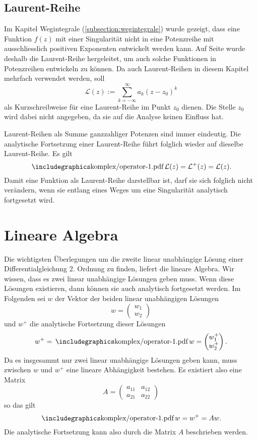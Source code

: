 \subsection{Laurent-Reihe}
Im Kapitel Wegintegrale (\ref{subsection:wegintegrale}) wurde gezeigt, dass eine Funktion $f(z)$ mit einer Singularität nicht in eine Potenzreihe mit ausschliesslich positiven Exponenten entwickelt werden kann. Auf Seite \pageref{sssec:LaurentReihen} wurde deshalb die Laurent-Reihe hergeleitet, um auch solche Funktionen in Potenzreihen entwickeln zu können. Da auch Laurent-Reihen in diesem Kapitel mehrfach verwendet werden, soll
$$\mathcal{L}(z):=\sum_{k=-\infty}^{\infty}a_k(z-z_0)^k$$
als Kurzschreibweise für eine Laurent-Reihe im Punkt $z_0$ dienen. Die Stelle $z_0$ wird dabei nicht angegeben, da sie auf die Analyse keinen Einfluss hat.

Laurent-Reihen als Summe ganzzahliger Potenzen sind immer eindeutig. Die analytische Fortsetzung einer Laurent-Reihe führt folglich wieder auf dieselbe Laurent-Reihe. Es gilt
$$\sk \mathcal{L}(z)=\mathcal{L}^+(z)=\mathcal{L}(z).$$
Damit eine Funktion als Laurent-Reihe darstellbar ist, darf sie sich folglich nicht verändern, wenn sie entlang eines Weges um eine Singularität analytisch fortgesetzt wird.

\section{Lineare Algebra}
Die wichtigsten Überlegungen um die zweite linear unabhängige Lösung einer Differentialgleichung 2. Ordnung zu finden, liefert die lineare Algebra. Wir wissen, dass es zwei linear unabhängige Lösungen geben muss. Wenn diese Lösungen existieren, dann können sie auch analytisch fortgesetzt werden. Im Folgenden sei $w$ der Vektor der beiden linear unabhängigen Lösungen
$$w = \begin{pmatrix} w_1 \\ w_2 \end{pmatrix} $$
und $w^+$ die analytische Fortsetzung dieser Lösungen
$$w^+= \sk w = \begin{pmatrix}
w_1^+\\ w_2^+
\end{pmatrix}.
$$
Da es insgesammt nur zwei linear unabhängige Lösungen geben kann, muss zwischen $w$ und $w^+$ eine lineare Abhängigkeit bestehen. Es existiert also eine Matrix
$$A = \begin{pmatrix}a_{11} & a_{12} \\ a_{21} & a_{22}\end{pmatrix}$$
so das gilt
$$\sk w = w^+ = Aw.$$
Die analytische Fortsetzung kann also durch die Matrix $A$ beschrieben werden.

